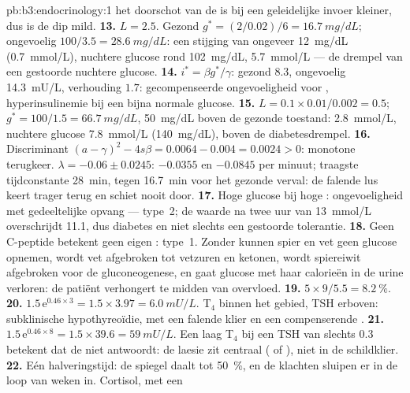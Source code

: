 \begin{solution}{pb:b3:endocrinology:1}
het doorschot van de  is bij een geleidelijke invoer kleiner,
dus is de dip mild.
\textbf{13.} $L = 2.5$. Gezond $g^{*} = (2/0.02)/6 = \qty{16.7}{mg/dL}$;
ongevoelig $100/3.5 = \qty{28.6}{mg/dL}$: een stijging van ongeveer
\qty{12}{mg/dL} (\qty{0.7}{mmol/L}), nuchtere glucose rond
\qty{102}{mg/dL}, \qty{5.7}{mmol/L} --- de drempel van een gestoorde
nuchtere glucose.
\textbf{14.} $i^{*} = \beta g^{*}/\gamma$: gezond $8.3$, ongevoelig
\qty{14.3}{mU/L}, verhouding $1.7$: gecompenseerde ongevoeligheid voor
, hyperinsulinemie bij een bijna normale glucose.
\textbf{15.} $L = 0.1\times 0.01/0.002 = 0.5$; $g^{*} = 100/1.5 =
\qty{66.7}{mg/dL}$, \qty{50}{mg/dL} boven de gezonde toestand:
\qty{2.8}{mmol/L}, nuchtere glucose \qty{7.8}{mmol/L}
(\qty{140}{mg/dL}), boven de diabetesdrempel.
\textbf{16.} Discriminant $(a - \gamma)^{2} - 4s\beta = 0.0064 - 0.004 =
0.0024 > 0$: monotone terugkeer. $\lambda = -0.06 \pm 0.0245$: $-0.0355$
en $-0.0845$ per minuut; traagste tijdconstante \qty{28}{min}, tegen
\qty{16.7}{min} voor het gezonde verval: de falende lus keert trager
terug en schiet nooit door.
\textbf{17.} Hoge glucose bij hoge : ongevoeligheid met
gedeeltelijke opvang --- type~2; de waarde na twee uur van
\qty{13}{mmol/L} overschrijdt \qty{11.1}{}, dus diabetes en niet
slechts een gestoorde tolerantie.
\textbf{18.} Geen C-peptide betekent geen eigen : type~1.
Zonder  kunnen spier en vet geen glucose opnemen, wordt vet
afgebroken tot vetzuren en ketonen, wordt spiereiwit afgebroken voor de
gluconeogenese, en gaat glucose met haar calorieën in de urine
verloren: de patiënt verhongert te midden van overvloed.
\textbf{19.} $5\times 9/5.5 = \qty{8.2}{\%}$.
\textbf{20.} $1.5\,\mathrm{e}^{0.46\times 3} = 1.5\times 3.97 =
\qty{6.0}{mU/L}$. T$_{4}$ binnen het gebied, TSH erboven: subklinische
hypothyreoïdie, met een falende klier en een compenserende .
\textbf{21.} $1.5\,\mathrm{e}^{0.46\times 8} = 1.5\times 39.6 =
\qty{59}{mU/L}$. Een laag T$_{4}$ bij een TSH van slechts $0.3$
betekent dat de  niet antwoordt: de laesie zit centraal
( of ), niet in de schildklier.
\textbf{22.} Eén halveringstijd: de spiegel daalt tot \qty{50}{\%}, en
de klachten sluipen er in de loop van weken in. Cortisol, met een

\end{solution}
